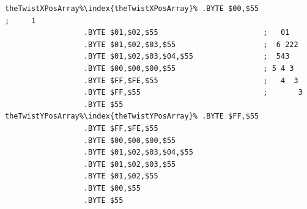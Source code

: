 \begin{lstlisting}[escapechar=\%]
theTwistXPosArray%\index{theTwistXPosArray}% .BYTE $00,$55                            ;     1  
                  .BYTE $01,$02,$55                        ;   01   
                  .BYTE $01,$02,$03,$55                    ;  6 222 
                  .BYTE $01,$02,$03,$04,$55                ;  543   
                  .BYTE $00,$00,$00,$55                    ; 5 4 3  
                  .BYTE $FF,$FE,$55                        ;   4  3 
                  .BYTE $FF,$55                            ;       3
                  .BYTE $55
theTwistYPosArray%\index{theTwistYPosArray}% .BYTE $FF,$55
                  .BYTE $FF,$FE,$55
                  .BYTE $00,$00,$00,$55
                  .BYTE $01,$02,$03,$04,$55
                  .BYTE $01,$02,$03,$55
                  .BYTE $01,$02,$55
                  .BYTE $00,$55
                  .BYTE $55
\end{lstlisting}


